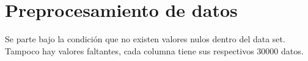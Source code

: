 \documentclass[12pt]{report}
\renewcommand{\_}{\kern-1.5pt\textunderscore\kern-1.5pt}
\begin{document}
\vspace{\baselineskip}

\vspace{\baselineskip}

\vspace{\baselineskip}

\vspace{\baselineskip}

\vspace{\baselineskip}

\vspace{\baselineskip}

\vspace{\baselineskip}

\vspace{\baselineskip}

\vspace{\baselineskip}

\vspace{\baselineskip}

\vspace{\baselineskip}

\vspace{\baselineskip}

\vspace{\baselineskip}

\vspace{\baselineskip}

\vspace{\baselineskip}

\vspace{\baselineskip}
\section{Preprocesamiento de datos}

\vspace{\baselineskip}
Se parte bajo la condición que no existen valores nulos dentro del data set.
Tampoco hay valores faltantes, cada columna tiene sus respectivos 30000 datos.

\vspace{\baselineskip}


\end{document}
